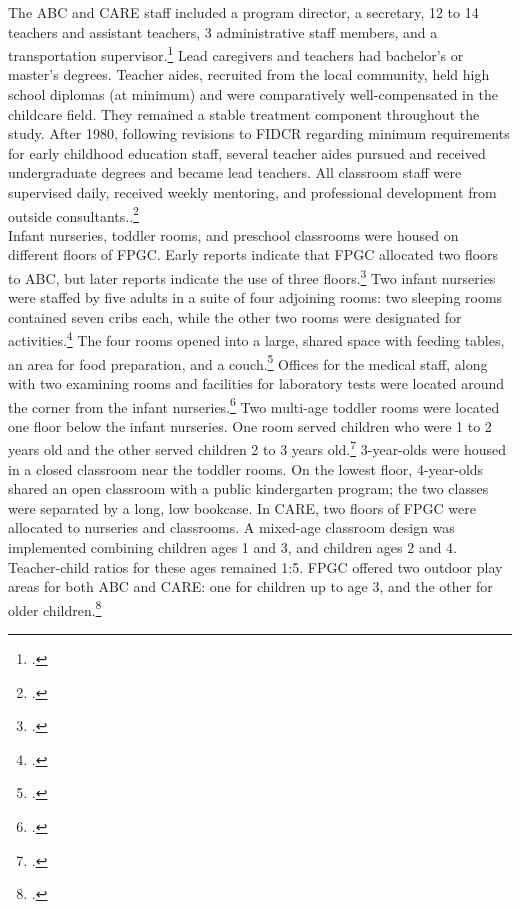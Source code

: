\begin{appendices}
\noindent The ABC and CARE staff included a program director, a secretary, 12 to 14 teachers and assistant teachers, 3 administrative staff members, and a transportation supervisor.\footnote{\citet{Ramey-et-al_1977_Intro-to-ABC,Ramey_McGinness_etal_1982_Abecedarianapproach, Bryant_et_al_1987_Carolina_Approach_TIECSE}.} Lead caregivers and teachers had bachelor's or master's degrees. Teacher aides, recruited from the local community, held high school diplomas (at minimum) and were comparatively well-compensated in the childcare field. They remained a stable treatment component throughout the study. After 1980, following revisions to FIDCR regarding minimum requirements for early childhood education staff, several teacher aides pursued and received undergraduate degrees and became lead teachers. All classroom staff were supervised daily, received weekly mentoring, and professional development from outside consultants..\footnote{\citet{Obrien-Sanders_1974_ABC-brochure, Ramey_etal_1985_Project-CARE_TiECSE, Sanders-Stokes_1979_Status-Report,Klein-Sanders_1982_Status-Report,abc2014-2015interviews}.}\\

\noindent Infant nurseries, toddler rooms, and preschool classrooms were housed on different floors of FPGC. Early reports indicate that FPGC allocated two floors to ABC, but later reports indicate the use of three floors.\footnote{\citet{Ramey_Smith_1977_AJMD,Ramey_Campbell_1979_SR,Ramey_1981_Modification}.} Two infant nurseries were staffed by five adults in a suite of four adjoining rooms: two sleeping rooms contained seven cribs each, while the other two rooms were designated for activities.\footnote{ \citet{Ramey-et-al_1977_Intro-to-ABC}.} The four rooms opened into a large, shared space with feeding tables, an area for food preparation, and a couch.\footnote{\citet{Ramey_Campbell_1979_SR}.} Offices for the medical staff, along with two examining rooms and facilities for laboratory tests were located around the corner from the infant nurseries.\footnote{\citet{abc2014-2015interviews}.} Two multi-age toddler rooms were located one floor below the infant nurseries. One room served children who were 1 to 2 years old and the other served children 2 to 3 years old.\footnote{\citet{Ramey_Smith_1977_AJMD,Ramey_Campbell_1979_SR}.} 3-year-olds were housed in a closed classroom near the toddler rooms. On the lowest floor, 4-year-olds shared an open classroom with a public kindergarten program; the two classes were separated by a long, low bookcase. In CARE, two floors of FPGC were allocated to nurseries and classrooms. A mixed-age classroom design was implemented combining children ages 1 and 3, and children ages 2 and 4. Teacher-child ratios for these ages remained 1:5. FPGC offered two outdoor play areas for both ABC and CARE: one for children up to age 3, and the other for older children.\footnote{\citet{Ramey_Campbell_1979_SR,Ramey_McGinness_etal_1982_Abecedarianapproach}.}\\


\end{appendices}
